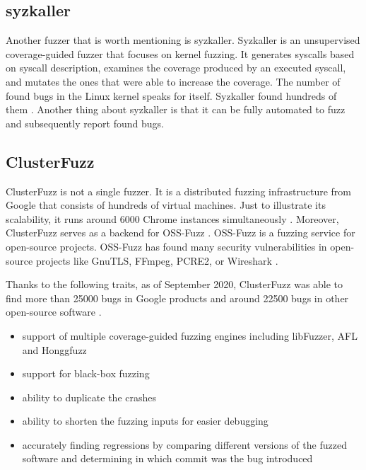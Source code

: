 \subsection{syzkaller}
Another fuzzer that is worth mentioning is syzkaller. Syzkaller is an unsupervised coverage-guided fuzzer that focuses on kernel fuzzing. It generates syscalls based on syscall description, examines the coverage produced by an executed syscall, and mutates the ones that were able to increase the coverage. The number of found bugs in the Linux kernel speaks for itself. Syzkaller found hundreds of them \cite{syzkaller2020bugs}. Another thing about syzkaller is that it can be fully automated to fuzz and subsequently report found bugs.


\subsection{ClusterFuzz}
ClusterFuzz is not a single fuzzer. It is a distributed fuzzing infrastructure from Google that consists of hundreds of virtual machines. Just to illustrate its scalability, it runs around 6000 Chrome instances simultaneously \cite{xu2017designing}. Moreover, ClusterFuzz serves as a backend for OSS-Fuzz \cite{ossfuzz2020readme}. OSS-Fuzz is a fuzzing service for open-source projects. OSS-Fuzz has found many security vulnerabilities in open-source projects like GnuTLS, FFmpeg, PCRE2, or Wireshark \cite{chang2017oss}.

Thanks to the following traits, as of September 2020, ClusterFuzz was able to find more than 25000 bugs in Google products and around 22500 bugs in other open-source software \cite{clusterfuzz2020readme}.

\begin{itemize}
    \item support of multiple coverage-guided fuzzing engines including libFuzzer, AFL and Honggfuzz
    \item support for black-box fuzzing
    \item ability to duplicate the crashes
    \item ability to shorten the fuzzing inputs for easier debugging
    \item accurately finding regressions by comparing different versions of the fuzzed software and determining in which commit was the bug introduced
\end{itemize}
